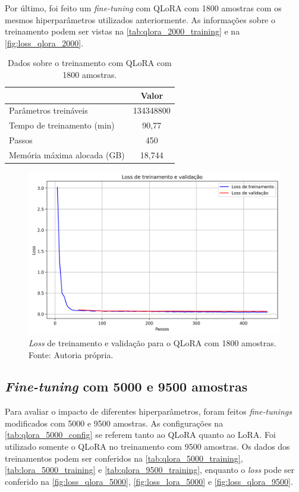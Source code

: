 Por último, foi feito um \textit{fine-tuning} com \ac{QLoRA} com 1800 amostras com os mesmos hiperparâmetros utilizados anteriormente. As informações sobre o treinamento
podem ser vistas na \autoref{tab:qlora_2000_training} e na \autoref{fig:loss_qlora_2000}.

\clearpage

\begin{table}[ht]
    \caption{\small Dados sobre o treinamento com \ac{QLoRA} com 1800 amostras.}
    \centering
    \begin{tabular}{l|c}
        \hline
                                    & Valor     \\ \hline
        Parâmetros treináveis       & 134348800 \\
        Tempo de treinamento (min)  & 90,77     \\
        Passos                      & 450       \\
        Memória máxima alocada (GB) & 18,744    \\ \hline
    \end{tabular}
    \label{tab:qlora_2000_training}
\end{table}

\begin{figure}[ht]
    \centering
    \includegraphics[width=0.725\columnwidth,keepaspectratio]{images/loss_qlora_2000.png}
    \caption{\small \textit{Loss} de treinamento e validação para o \ac{QLoRA} com 1800 amostras. Fonte: Autoria própria.}
    \label{fig:loss_qlora_2000}
\end{figure}

\subsection{\textit{Fine-tuning} com 5000 e 9500 amostras}

Para avaliar o impacto de diferentes hiperparâmetros, foram feitos \textit{fine-tunings} modificados com 5000 e 9500 amostras. As configurações na
\autoref{tab:qlora_5000_config} se referem tanto ao \ac{QLoRA} quanto ao \ac{LoRA}. Foi utilizado somente o \ac{QLoRA} no treinamento com 9500 amostras. Os dados dos
treinamentos podem ser conferidos na \autoref{tab:qlora_5000_training}, \autoref{tab:lora_5000_training} e \autoref{tab:qlora_9500_training}, enquanto o \textit{loss}
pode ser conferido na \autoref{fig:loss_qlora_5000}, \autoref{fig:loss_lora_5000} e \autoref{fig:loss_qlora_9500}.

